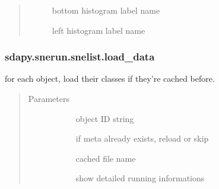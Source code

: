 \documentclass[letterpaper,10pt,english]{sphinxmanual}
\begin{document}
\begin{fulllineitems}
\begin{fulllineitems}
\begin{quote}
\begin{description}
\begin{description}
\item[{}] \leavevmode{[}\sphinxtitleref{str}{]}
bottom histogram label name

\item[{}] \leavevmode{[}\sphinxtitleref{str}{]}
left histogram label name

\end{description}

\end{description}\end{quote}

\end{fulllineitems}



\subsubsection{sdapy.snerun.snelist.load\_data}
\label{\detokenize{generated/sdapy.snerun.snelist.load_data:sdapy-snerun-snelist-load-data}}\label{\detokenize{generated/sdapy.snerun.snelist.load_data::doc}}

\begin{fulllineitems}
\label{\detokenize{generated/sdapy.snerun.snelist.load_data:sdapy.snerun.snelist.load_data}}
for each object, load their  classes if they’re cached before.
\begin{quote}\begin{description}
\item[{Parameters}] \leavevmode\begin{description}
\item[{}] \leavevmode{[}\sphinxtitleref{str}{]}
object ID string

\item[{}] \leavevmode{[}\sphinxtitleref{bool}{]}
if meta already exists, reload or skip

\item[{}] \leavevmode{[}\sphinxtitleref{str}{]}
cached file name

\item[{}] \leavevmode{[}\sphinxtitleref{bool}{]}
show detailed running informations


\end{description}
\end{description}
\end{quote}
\end{fulllineitems}
\end{fulllineitems}
\end{document}
